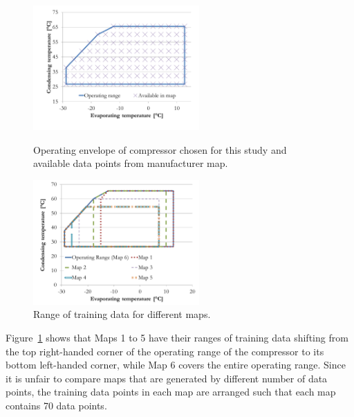 \begin{figure}[h]
\begin{minipage}{15pc}
\includegraphics[width=15pc]{./fig/operating_envelope.pdf}
\caption{\label{fig:oper_envelope}Operating envelope of compressor chosen for this study and available data points from manufacturer map.}
\end{minipage}\hspace{2pc}%
\begin{minipage}{15pc}
\includegraphics[width=15pc]{./fig/training_data_sets.pdf}
\caption{\label{fig:training_envelope} Range of training data for different maps.}
\end{minipage} 
\end{figure}

Figure~\ref{fig:training_envelope} shows that Maps 1 to 5 have their ranges of training data shifting from the top right-handed corner of the operating range of the compressor to its bottom left-handed corner, while Map 6 covers the entire operating range. Since it is unfair to compare maps that are generated by different number of data points, the training data points in each map are arranged such that each map contains 70 data points.